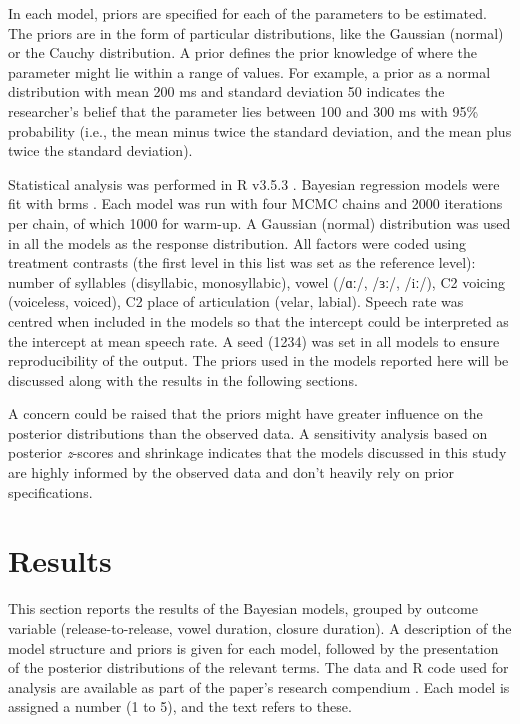 \documentclass[
  12pt,
  a4paper,
]{article}
\begin{document}
In each model, priors are specified for each of the parameters to be
estimated. The priors are in the form of particular distributions, like
the Gaussian (normal) or the Cauchy distribution. A prior defines the
prior knowledge of where the parameter might lie within a range of
values. For example, a prior as a normal distribution with mean 200 ms
and standard deviation 50 indicates the researcher's belief that the
parameter lies between 100 and 300 ms with 95\% probability (i.e., the
mean minus twice the standard deviation, and the mean plus twice the
standard deviation).

Statistical analysis was performed in R v3.5.3 \citep{r-core-team2019}.
Bayesian regression models were fit with brms
\citep{burkner2017, burkner2018}. Each model was run with four MCMC
chains and 2000 iterations per chain, of which 1000 for warm-up. A
Gaussian (normal) distribution was used in all the models as the
response distribution. All factors were coded using treatment contrasts
(the first level in this list was set as the reference level): number of
syllables (disyllabic, monosyllabic), vowel (/ɑː/, /ɜː/, /iː/), C2
voicing (voiceless, voiced), C2 place of articulation (velar, labial).
Speech rate was centred when included in the models so that the
intercept could be interpreted as the intercept at mean speech rate. A
seed (1234) was set in all models to ensure reproducibility of the
output. The priors used in the models reported here will be discussed
along with the results in the following sections.

A concern could be raised that the priors might have greater influence
on the posterior distributions than the observed data. A sensitivity
analysis based on posterior \emph{z}-scores and shrinkage
\citep{betancourt2018} indicates that the models discussed in this study
are highly informed by the observed data and don't heavily rely on prior
specifications.

\hypertarget{results}{%
\section{Results}\label{results}}

This section reports the results of the Bayesian models, grouped by
outcome variable (release-to-release, vowel duration, closure duration).
A description of the model structure and priors is given for each model,
followed by the presentation of the posterior distributions of the
relevant terms. The data and R code used for analysis are available as
part of the paper's research compendium \citep{coretta2019b}. Each model
is assigned a number (1 to 5), and the text refers to these.
\end{document}
